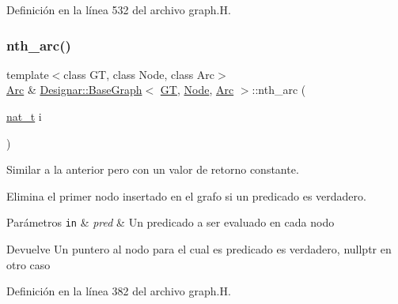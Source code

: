 Definición en la línea 532 del archivo graph.\+H.

\mbox{\label{class_designar_1_1_base_graph_a3fed87a68cc763e63369558423235e00}} 
\subsubsection{\texorpdfstring{nth\+\_\+arc()}{nth\_arc()}\hspace{0.1cm}{\footnotesize\ttfamily [1/2]}}
{\footnotesize\ttfamily template$<$class GT, class Node, class Arc$>$ \\
\hyperlink{namespace_designar_a3f55fb5513d62ff47cbc8f72b8e95d6f}{Arc} \& \hyperlink{class_designar_1_1_base_graph}{Designar\+::\+Base\+Graph}$<$ \hyperlink{demo-buildgraph_8_c_a3001c40d2c31ca87ed96cd7d1334a55e}{GT}, \hyperlink{namespace_designar_a5af326c65aa2bd26b26c410f2030d09e}{Node}, \hyperlink{namespace_designar_a3f55fb5513d62ff47cbc8f72b8e95d6f}{Arc} $>$\+::nth\+\_\+arc (\begin{DoxyParamCaption}\item[{\hyperlink{namespace_designar_aa72662848b9f4815e7bf31a7cf3e33d1}{nat\+\_\+t}}]{i }\end{DoxyParamCaption})\hspace{0.3cm}{\ttfamily [inline]}}



Similar a la anterior pero con un valor de retorno constante. 

Elimina el primer nodo insertado en el grafo si un predicado es verdadero.


\begin{DoxyParams}[1]{Parámetros}
\mbox{\tt in}  & {\em pred} & Un predicado a ser evaluado en cada nodo \\
\hline
\end{DoxyParams}
\begin{DoxyReturn}{Devuelve}
Un puntero al nodo para el cual es predicado es verdadero, {\ttfamily nullptr} en otro caso 
\end{DoxyReturn}


Definición en la línea 382 del archivo graph.\+H.

\mbox{\label{class_designar_1_1_base_graph_aaff3c76e0e0094d4ec1eaecd155ca951}} 
